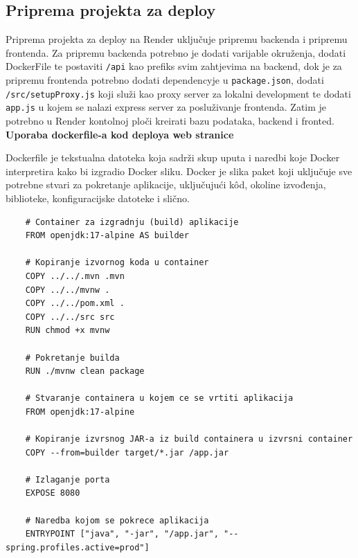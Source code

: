 			\subsection{Priprema projekta za deploy}
			
			Priprema projekta za deploy na Render uključuje pripremu backenda i pripremu frontenda. Za pripremu backenda potrebno je dodati varijable okruženja, dodati DockerFile te postaviti \texttt{/api} kao prefiks svim zahtjevima na backend, dok je za pripremu frontenda potrebno dodati dependencyje u \texttt{package.json}, dodati \texttt{/src/setupProxy.js} koji služi kao proxy server za lokalni development te dodati \texttt{app.js} u kojem se nalazi express server za posluživanje frontenda. Zatim je potrebno u Render kontolnoj ploči kreirati bazu podataka, backend i fronted.\\
			
			\noindent \textbf{Uporaba dockerfile-a kod deploya web stranice}
			
			\vspace{0.2cm}
			
			
			\noindent Dockerfile je tekstualna datoteka koja sadrži skup uputa i naredbi koje Docker interpretira kako bi izgradio Docker sliku. Docker je slika paket koji uključuje sve potrebne stvari za pokretanje aplikacije, uključujući kôd, okoline izvođenja, biblioteke, konfiguracijske datoteke i slično.
			
			
			
\begin{lstlisting}
	# Container za izgradnju (build) aplikacije
	FROM openjdk:17-alpine AS builder
	
	# Kopiranje izvornog koda u container
	COPY ../../.mvn .mvn
	COPY ../../mvnw .
	COPY ../../pom.xml .
	COPY ../../src src
	RUN chmod +x mvnw
	
	# Pokretanje builda
	RUN ./mvnw clean package
	
	# Stvaranje containera u kojem ce se vrtiti aplikacija
	FROM openjdk:17-alpine
	
	# Kopiranje izvrsnog JAR-a iz build containera u izvrsni container
	COPY --from=builder target/*.jar /app.jar
	
	# Izlaganje porta
	EXPOSE 8080
	
	# Naredba kojom se pokrece aplikacija
	ENTRYPOINT ["java", "-jar", "/app.jar", "--spring.profiles.active=prod"]
\end{lstlisting}

